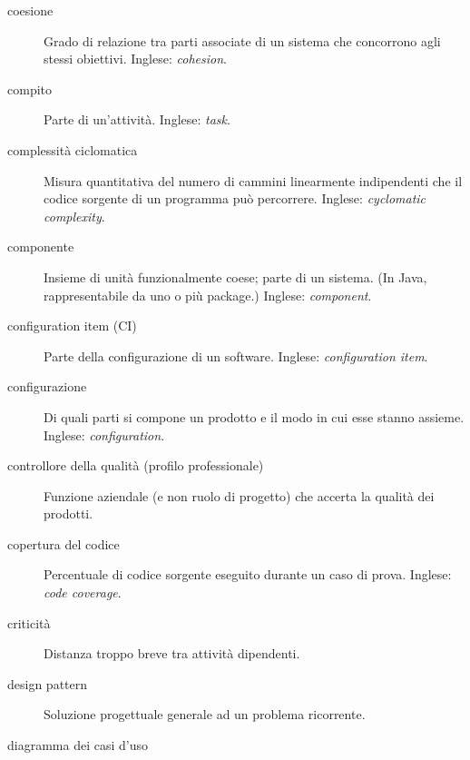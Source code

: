 \documentclass[a4paper]{article}
\begin{document}
\begin{description}
	\item[coesione] 

			Grado di relazione tra parti associate di un sistema che concorrono agli stessi obiettivi. Inglese: \emph{cohesion}.
			
	\item[compito] 

			Parte di un'attività. Inglese: \emph{task}.
			
	\item[complessità ciclomatica] 

			Misura quantitativa del numero di cammini linearmente indipendenti che il codice sorgente di un programma può percorrere. Inglese: \emph{cyclomatic complexity}.
			
	\item[componente] 

			Insieme di unità funzionalmente coese; parte di un sistema. (In Java, rappresentabile da uno o più package.) Inglese: \emph{component}.
			
	\item[configuration item (CI)] 

			Parte della configurazione di un software. Inglese: \emph{configuration item}.
			
	\item[configurazione] 

			Di quali parti si compone un prodotto e il modo in cui esse stanno assieme. Inglese: \emph{configuration}.
			
	\item[controllore della qualità (profilo professionale)] 

			Funzione aziendale (e non ruolo di progetto) che accerta la qualità dei prodotti.
			
	\item[copertura del codice] 

			Percentuale di codice sorgente eseguito durante un caso di prova. Inglese: \emph{code coverage}.
			
	\item[criticità] 

			Distanza troppo breve tra attività dipendenti.
			
	\item[design pattern] 

			Soluzione progettuale generale ad un problema ricorrente.
			
	\item[diagramma dei casi d'uso] 


\end{description}
\end{document}
